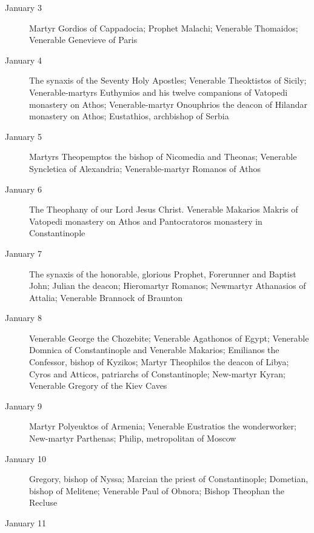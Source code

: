 \begin{description}
\item[January 3]

Martyr Gordios of Cappadocia; Prophet Malachi; Venerable Thomaidos; Venerable Genevieve of Paris

\item[January 4]

The synaxis of the Seventy Holy Apostles; Venerable Theoktistos of Sicily; Venerable-martyrs Euthymios and his twelve companions of Vatopedi monastery on Athos; Venerable-martyr Onouphrios the deacon of Hilandar monastery on Athos; Eustathios, archbishop of Serbia

\item[January 5]

Martyrs Theopemptos the bishop of Nicomedia and Theonas; Venerable Syncletica of Alexandria; Venerable-martyr Romanos of Athos

\item[January 6]

The Theophany of our Lord Jesus Christ. Venerable Makarios Makris of Vatopedi monastery on Athos and Pantocratoros monastery in Constantinople

\item[January 7]

The synaxis of the honorable, glorious Prophet, Forerunner and Baptist John; Julian the deacon; Hieromartyr Romanos; Newmartyr Athanasios of Attalia; Venerable Brannock of Braunton

\item[January 8]

Venerable George the Chozebite; Venerable Agathonos of Egypt; Venerable Domnica of Constantinople and Venerable Makarios; Emilianos the Confessor, bishop of Kyzikos; Martyr Theophilos the deacon of Libya; Cyros and Atticos, patriarchs of Constantinople; New-martyr Kyran; Venerable Gregory of the Kiev Caves

\item[January 9]

Martyr Polyeuktos of Armenia; Venerable Eustratios the wonderworker; New-martyr Parthenas; Philip, metropolitan of Moscow

\item[January 10]

Gregory, bishop of Nyssa; Marcian the priest of Constantinople; Dometian, bishop of Melitene; Venerable Paul of Obnora; Bishop Theophan the Recluse

\item[January 11]


\end{description}
